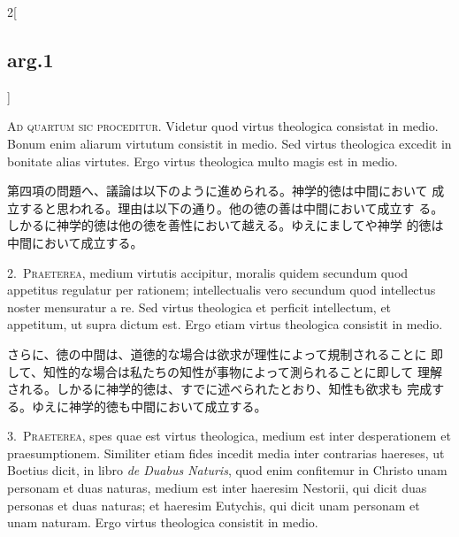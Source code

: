 \documentclass[paper=a4paper,fontsize=10pt,jafontsize=9pt,titlepage]{jlreq}
\begin{document}
\begin{paracol}{2}[\subsection{arg.1}]

{\scshape Ad quartum sic proceditur}. Videtur quod virtus theologica
 consistat in medio. Bonum enim aliarum virtutum consistit in
 medio. Sed virtus theologica excedit in bonitate alias virtutes. Ergo
 virtus theologica multo magis est in medio.

\switchcolumn

第四項の問題へ、議論は以下のように進められる。神学的徳は中間において
 成立すると思われる。理由は以下の通り。他の徳の善は中間において成立す
 る。しかるに神学的徳は他の徳を善性において越える。ゆえにましてや神学
 的徳は中間において成立する。


2.~{\scshape Praeterea}, medium virtutis accipitur, moralis quidem
secundum quod appetitus regulatur per rationem; intellectualis vero
secundum quod intellectus noster mensuratur a re. Sed virtus
theologica et perficit intellectum, et appetitum, ut supra dictum
est. Ergo etiam virtus theologica consistit in medio.

\switchcolumn

さらに、徳の中間は、道徳的な場合は欲求が理性によって規制されることに
 即して、知性的な場合は私たちの知性が事物によって測られることに即して
 理解される。しかるに神学的徳は、すでに述べられたとおり、知性も欲求も
 完成する。ゆえに神学的徳も中間において成立する。


3.~{\scshape Praeterea}, spes quae est virtus theologica, medium est
inter desperationem et praesumptionem. Similiter etiam fides incedit
media inter contrarias haereses, ut Boetius dicit, in libro {\itshape
de Duabus Naturis}, quod enim confitemur in Christo unam personam et
duas naturas, medium est inter haeresim Nestorii, qui dicit duas
personas et duas naturas; et haeresim Eutychis, qui dicit unam
personam et unam naturam. Ergo virtus theologica consistit in medio.


\end{paracol}
\end{document}
